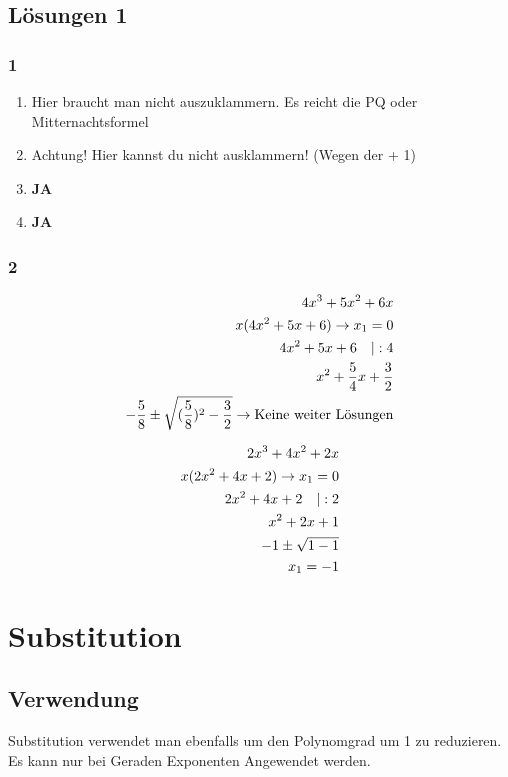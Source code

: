 \documentclass[11pt,a4paper]{article}
\begin{document}
\newpage

\subsection{Lösungen 1}

\subsubsection*{1}

\begin{enumerate}
\item Hier braucht man nicht auszuklammern. Es reicht die PQ oder Mitternachtsformel
\item Achtung! Hier kannst du nicht ausklammern! (Wegen der + 1)
\item \textbf{JA}
\item \textbf{JA}
\end{enumerate}

\subsubsection*{2}

\begin{eqnarray}
4x^3 + 5x^2 + 6x\\
x(4x^2 + 5x + 6) \rightarrow x_1 = 0\\
4x^2 + 5x + 6 \quad \text{\textbar} : 4\\
x^2 + \dfrac{5}{4} x + \dfrac{3}{2}\\
-\dfrac{5}{8} \pm \sqrt{(\dfrac{5}{8})^2 - \dfrac{3}{2}} \rightarrow \text{Keine weiter Lösungen}
\end{eqnarray}

\begin{eqnarray}
2x^3 + 4x^2 + 2x\\
x(2x^2 + 4x + 2) \rightarrow x_1 = 0\\
2x^2 + 4x + 2 \quad \text{\textbar} : 2\\
x^2 + 2x + 1\\
-1 \pm \sqrt{1 - 1}\\
x_1 = -1
\end{eqnarray}

\newpage

\section{Substitution}

\subsection{Verwendung}
Substitution verwendet man ebenfalls um den Polynomgrad um 1 zu reduzieren. Es kann nur bei Geraden Exponenten Angewendet werden.
\end{document}
